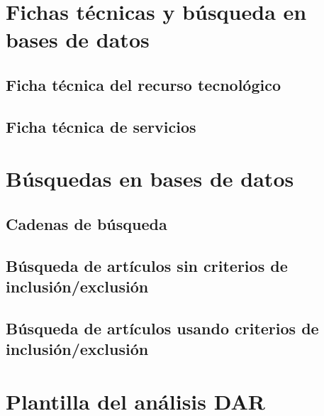 \appendix

\chapter{Fichas técnicas y búsqueda en bases de datos}\label{apendice:fichas-y-busquedas}

\FloatBarrier\section{Ficha técnica del recurso tecnológico}


\FloatBarrier\section{Ficha técnica de servicios}


\FloatBarrier\chapter{Búsquedas en bases de datos}

\section{Cadenas de búsqueda}\label{sec:cadenas-busqueda}



\section{Búsqueda de artículos sin criterios de inclusión/exclusión}\label{sec:busqueda-sin-criterios}


\FloatBarrier\section{Búsqueda de artículos usando criterios de inclusión/exclusión}\label{sec:busqueda-con-criterios}



\FloatBarrier\chapter{Plantilla del análisis DAR}





